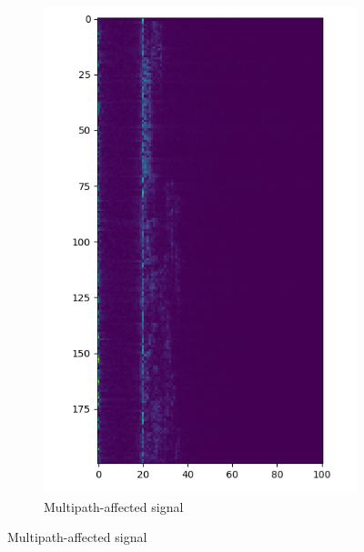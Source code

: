 \documentclass[a4paper]{article}
\begin{document}
\begin{figure}[H]
\begin{subfigure}{0.45\textwidth}
        \includegraphics[width=1\textwidth]{waterfall_sync_multipath.png}
        \caption{\label{fig:waterfall_sync_multipath}Multipath-affected signal}
    \end{subfigure}
\end{figure}
\end{document}
